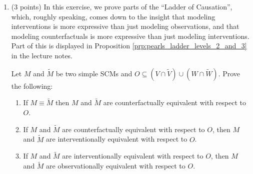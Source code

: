 \begin{enumerate}
\item (3 points) In this exercise, we prove parts of the ``Ladder of Causation'', which, roughly speaking, comes down to the insight that modeling interventions is more expressive than just modeling observations, and that modeling counterfactuals is more expressive than just modeling interventions.
Part of this is displayed in Proposition \ref*{prp:pearls_ladder_levels_2_and_3} in the lecture notes.

Let $M$ and $\tilde{M}$ be two simple SCMs and $O \subseteq (V \cap \tilde{V}) \cup (W \cap \tilde{W})$. 
Prove the following:
\begin{enumerate}
	\item If $M \equiv \tilde{M}$ then $M$ and $\tilde{M}$ are counterfactually equivalent with respect to $O$.
	\item If $M$ and $\tilde{M}$ are counterfactually equivalent with respect to $O$, then $M$ and $\tilde{M}$ are interventionally equivalent with respect to $O$.
	\item If $M$ and $\tilde{M}$ are interventionally equivalent with respect to $O$, then $M$ and $\tilde{M}$ are observationally equivalent with respect to $O$.
\end{enumerate}


\end{enumerate}
